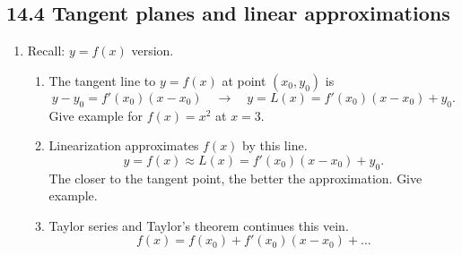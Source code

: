 \documentclass{article}
\begin{document}
\subsection{14.4 Tangent planes and linear approximations}

\begin{enumerate}
\item Recall: $y=f(x)$ version.
\begin{enumerate}
\item The tangent line to $y=f(x)$ at point $(x_0, y_0)$ is
\[
y-y_0 = f'(x_0)(x-x_0) \quad \rightarrow \quad y=L(x)=f'(x_0)(x-x_0)+y_0.
\]
Give example for $f(x)=x^2$ at $x=3$.
\item Linearization approximates $f(x)$ by this line.
\[
y=f(x) \approx L(x)=f'(x_0)(x-x_0)+y_0.
\]
The closer to the tangent point, the better the approximation. Give example.
\item Taylor series and Taylor's theorem continues this vein.
\[
f(x) = f(x_0) + f'(x_0)(x-x_0) + \dots
\]
\end{enumerate}


\end{enumerate}
\end{document}
